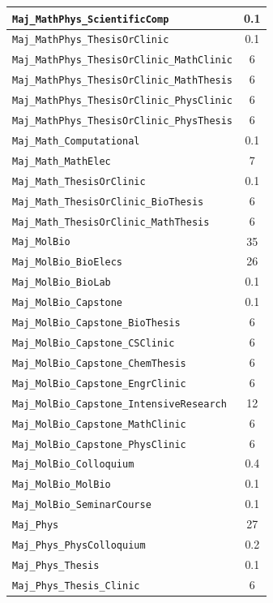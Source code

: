 \begin{longtable}{|p{}|c|}
    \verb|Maj_MathPhys_ScientificComp| & 0.1\\\hline
    \verb|Maj_MathPhys_ThesisOrClinic| & 0.1\\\hline
    \verb|Maj_MathPhys_ThesisOrClinic_MathClinic| & 6\\\hline
    \verb|Maj_MathPhys_ThesisOrClinic_MathThesis| & 6\\\hline
    \verb|Maj_MathPhys_ThesisOrClinic_PhysClinic| & 6\\\hline
    \verb|Maj_MathPhys_ThesisOrClinic_PhysThesis| & 6\\\hline
    \verb|Maj_Math_Computational| & 0.1\\\hline
    \verb|Maj_Math_MathElec| & 7\\\hline
    \verb|Maj_Math_ThesisOrClinic| & 0.1\\\hline
    \verb|Maj_Math_ThesisOrClinic_BioThesis| & 6\\\hline
    \verb|Maj_Math_ThesisOrClinic_MathThesis| & 6\\\hline
    \verb|Maj_MolBio| & 35\\\hline
    \verb|Maj_MolBio_BioElecs| & 26\\\hline
    \verb|Maj_MolBio_BioLab| & 0.1\\\hline
    \verb|Maj_MolBio_Capstone| & 0.1\\\hline
    \verb|Maj_MolBio_Capstone_BioThesis| & 6\\\hline
    \verb|Maj_MolBio_Capstone_CSClinic| & 6\\\hline
    \verb|Maj_MolBio_Capstone_ChemThesis| & 6\\\hline
    \verb|Maj_MolBio_Capstone_EngrClinic| & 6\\\hline
    \verb|Maj_MolBio_Capstone_IntensiveResearch| & 12\\\hline
    \verb|Maj_MolBio_Capstone_MathClinic| & 6\\\hline
    \verb|Maj_MolBio_Capstone_PhysClinic| & 6\\\hline
    \verb|Maj_MolBio_Colloquium| & 0.4\\\hline
    \verb|Maj_MolBio_MolBio| & 0.1\\\hline
    \verb|Maj_MolBio_SeminarCourse| & 0.1\\\hline
    \verb|Maj_Phys| & 27\\\hline
    \verb|Maj_Phys_PhysColloquium| & 0.2\\\hline
    \verb|Maj_Phys_Thesis| & 0.1\\\hline
    \verb|Maj_Phys_Thesis_Clinic| & 6\\\hline

\end{longtable}
